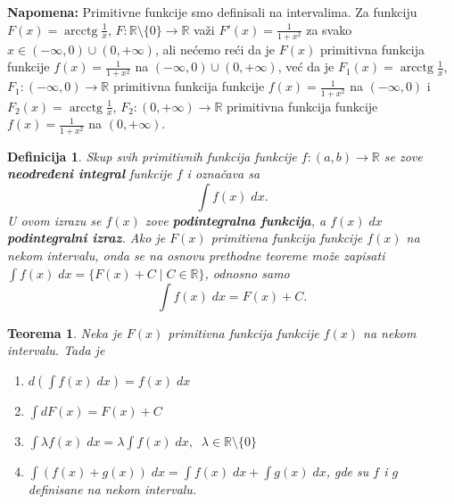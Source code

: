 \documentclass[a4paper,12pt,twoside]{report}
\newtheorem{theorem}{Teorema}[section]
\newtheorem{definition}{Definicija}[section]
\numberwithin{algorithm}{section}
\begin{document}
\noindent \textbf{Napomena:} Primitivne funkcije smo definisali na intervalima.
Za funkciju \(F(x) = \operatorname{arcctg} \frac{1}{x}\), \(F: \mathbb{R} \setminus \{0\} \to \mathbb{R}\) važi \(F'(x) = \frac{1}{1+x^2}\)
za svako \(x \in (-\infty, 0) \cup (0, +\infty)\), ali nećemo reći da je
\(F(x)\) primitivna funkcija funkcije \(f(x) = \frac{1}{1+x^2}\) na \((-\infty, 0) \cup (0, +\infty)\),
već da je \(F_1(x) = \operatorname{arcctg} \frac{1}{x}\), \(F_1: (-\infty, 0) \to \mathbb{R}\) primitivna funkcija
funkcije \(f(x) = \frac{1}{1+x^2}\) na \((-\infty, 0)\) i \(F_2(x) = \operatorname{arcctg} \frac{1}{x}\), \(F_2: (0, +\infty) \to \mathbb{R}\)
primitivna funkcija funkcije \(f(x) = \frac{1}{1+x^2}\) na \((0, +\infty)\).

\newpage

\begin{definition}
    Skup svih primitivnih funkcija funkcije $f:(a, b) \to \mathbb{R}$ se zove \textbf{neodređeni integral} funkcije $f$ i označava
    sa \[ \int f(x) \; dx. \] U ovom izrazu se $f(x)$ zove \textbf{podintegralna funkcija}, a $f(x)\;dx$ \textbf{podintegralni
    izraz}. Ako je $F(x)$ primitivna funkcija funkcije $f(x)$ na nekom intervalu, onda se na osnovu prethodne teoreme može zapisati
    $ \int f(x) \; dx = \{ F(x) + C \;|\; C \in \mathbb{R}\}$, odnosno samo
    \[ \int f(x) \; dx = F(x) + C. \]
\end{definition}

\begin{theorem}
    Neka je $F(x)$ primitivna funkcija funkcije $f(x)$ na nekom intervalu. Tada je
    \begin{enumerate}[label=\alph*)]
        \item $\displaystyle d\left(\int f(x) \; dx\right) = f(x)\;dx$
        \item $\displaystyle \int d F(x) = F(x) + C$
        \item $\displaystyle \int \lambda f(x) \; dx = \lambda \int f(x)\;dx, \;\; \lambda \in \mathbb{R}\setminus\{0\}$
        \item $\displaystyle \int\left(f(x) + g(x)\right)\;dx = \int f(x)\;dx + \int g(x)\;dx$, gde su $f$ i $g$ definisane na nekom intervalu.
    \end{enumerate}
\end{theorem}
\end{document}
